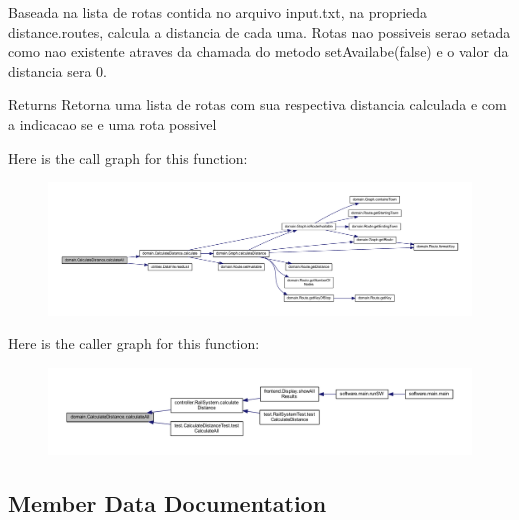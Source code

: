 Baseada na lista de rotas contida no arquivo \textquotesingle{}input.\+txt\textquotesingle{}, na proprieda \textquotesingle{}distance.\+routes\textquotesingle{}, calcula a distancia de cada uma. Rotas nao possiveis serao setada como nao existente atraves da chamada do metodo set\+Availabe(false) e o valor da distancia sera 0.

\begin{DoxyReturn}{Returns}
Retorna uma lista de rotas com sua respectiva distancia calculada e com a indicacao se e uma rota possivel 
\end{DoxyReturn}
Here is the call graph for this function\+:\nopagebreak
\begin{figure}[H]
\begin{center}
\leavevmode
\includegraphics[width=350pt]{classdomain_1_1_calculate_distance_a188113ff0f6a119f4addd523b5e06a9c_cgraph}
\end{center}
\end{figure}
Here is the caller graph for this function\+:\nopagebreak
\begin{figure}[H]
\begin{center}
\leavevmode
\includegraphics[width=350pt]{classdomain_1_1_calculate_distance_a188113ff0f6a119f4addd523b5e06a9c_icgraph}
\end{center}
\end{figure}


\subsection{Member Data Documentation}
\mbox{\label{classdomain_1_1_calculate_distance_aa7288f0798e8e530b5fd8c228a7b028c}} 
